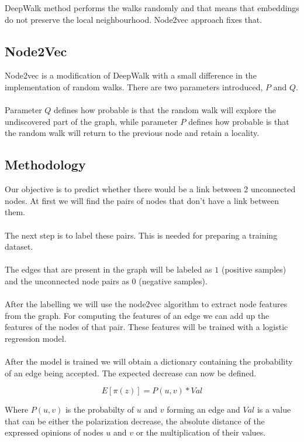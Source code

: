   \noindent  DeepWalk method performs the walks randomly and that means that embeddings do not preserve the local neighbourhood. Node2vec approach fixes that.		

  \subsection{Node2Vec}		

  Node2vec is a modification of DeepWalk with a small difference in  the implementation of random walks. There are two parameters introduced, $P$ and $Q$. 		
 \\		
 \\		
 Parameter $Q$ defines how probable is that the random walk will explore the undiscovered part of the graph, while parameter $P$ defines how probable is that the random walk will return to the previous node and retain a locality.		

  \subsection{Methodology}		
 \label{sec:methodology}		

Our objective is to predict whether there would be a link between 2 unconnected nodes. At first we will find the pairs of nodes that don't have a link between them.		
 \\		
 \\		
 The next step is to label these pairs. This is needed for preparing a training dataset. 
\\
\\
The edges that are present in the graph will be labeled as $1$ (positive samples) and the unconnected node pairs as $0$ (negative samples).		
 \\		
 \\		
 After the labelling we will use the node2vec algorithm to extract node features from the graph. For computing the features of an edge we can add up the features of the nodes of that pair. These features will be trained with a logistic regression model.
 \\
 \\
 After the model is trained we will obtain a dictionary containing the probability of an edge being accepted. The expected decrease can now be defined.
 
 \begin{equation} 
	 E[\pi(z)] = P(u,v) * Val
\end{equation}

\vspace{20pt}

\noindent Where $P(u,v)$ is the probabilty of $u$ and $v$ forming an edge and $Val$ is a value that can be either the polarization decrease, the absolute distance of the expressed opinions of nodes $u$ and $v$ or the multiplication of their values.
 		

  \clearpage

